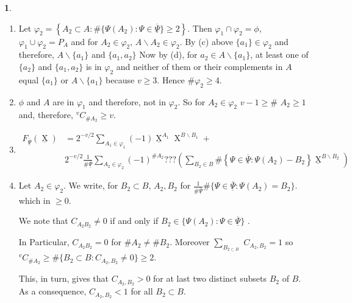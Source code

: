 \documentclass[a4paper,12pt]{article}
\DeclareMathOperator{\x}{\mathrm{X}}
\theoremstyle{definition}
\theoremstyle{underlinethm}
\theoremstyle{underline}
\newtheorem{subsubsec}{}[subsection]
\begin{document}
\begin{subsubsec}
\begin{enumerate}[label=(\alph*)]
\item Let $\varphi_{2} = \left\{A_{2} \subset A : \# \{\Psi (A_{2}) : \Psi \in \underline{\overline{\Psi}}\} \geq 2\right\}$. Then $\varphi_{1} \cap \varphi_{2} = \phi$, $\varphi_{1} \cup \varphi_{2} = P_{A}$ and for $A_{2} \in \varphi_{2}$, $A \smallsetminus A_{2} \in \varphi_{2}$. By (c) above $\{a_{1}\} \in \varphi_{2}$ and therefore, $A\smallsetminus \{a_{1}\}$ and $\{a_{1}, a_{2}\}$ Now by (d), for $a_{2}\in A\smallsetminus\{a_{1}\}$, at least one of $\{a_{2}\}$
and $\{a_{1}, a_{2}\}$ is in $\varphi_{2}$ and neither of them or their complements in $A$ equal $\{a_{1}\}$ or $A\smallsetminus\{a_{1}\}$ because $v\geq 3$. Hence $\# \varphi_{2}\geq 4$.

\item $\phi$ and $A$ are in $\varphi_{1}$ and therefore, not in $\varphi_{2}$. So for $A_{2} \in \varphi_{2}$ $v-1 \geq \#$ $A_{2}\geq 1$ and, therefore, $^{v}C_{\# A_{2}} \geq v$.

\item 
\begin{align*}
F_{\underline{\overline{\Psi}}}(\underline{\x}) &= 2^{-v/2} \sum_{A_{1} \in \varphi_{1}}(-1)  \underline{\x}^{A_{1}} \x^{B\smallsetminus B_{1}} + \\
   & 2^{-v/2} \frac{1}{\# \underline{\overline{\Psi}}} \sum_{A_{2} \in \varphi_{2}} (-1)^{\# A_{2}} ??? \left(\sum_{B_{2} \in B} \# \left\{\Psi \in \underline{\overline{\Psi}} : \Psi(A_{2}) - B_{2}\right\}\underline{\x}^{B\smallsetminus B_{2}}\right)\tag{3.9}
\end{align*}

\item Let $A_{2} \in \varphi_{2}$. We write, for $B_{2} \subset B$, $A_{2}, B_{2}$ for $\frac{1}{\#\underline{\overline{\Psi}}} \# \{\Psi \in \underline{\overline{\Psi}} : \Psi (A_{2}) = B_{2} \}$. which in $\geq 0$.

We note that $C_{A_{2}B_{2}} \neq 0$ if and only if $B_{2} \in \{ \Psi (A_{2}) : \Psi \in \underline{\overline{\Psi}}\}$ .

In Particular, $C_{A_{2}B_{2}} = 0$ for $\# A_{2} \neq \# B_{2}$. Moreover $\sum_{B_{2 \subset B}}$ $C_{A_{2}, B_{2}} =1$ so $^{v}C_{\# A_{2}} \geq \# \{B_{2} \subset B : C_{A_{2}, B_{2}} \neq 0 \} \geq 2$.

This, in turn, gives that $C_{A_{2}, B_{2}}>0$ for at last two distinct subsets $B_{2}$ of $B$. As a consequence, $C_{A_{2}, B_{2}} < 1$ for all $B_{2} \subset B$.


\end{enumerate}
\end{subsubsec}
\end{document}
